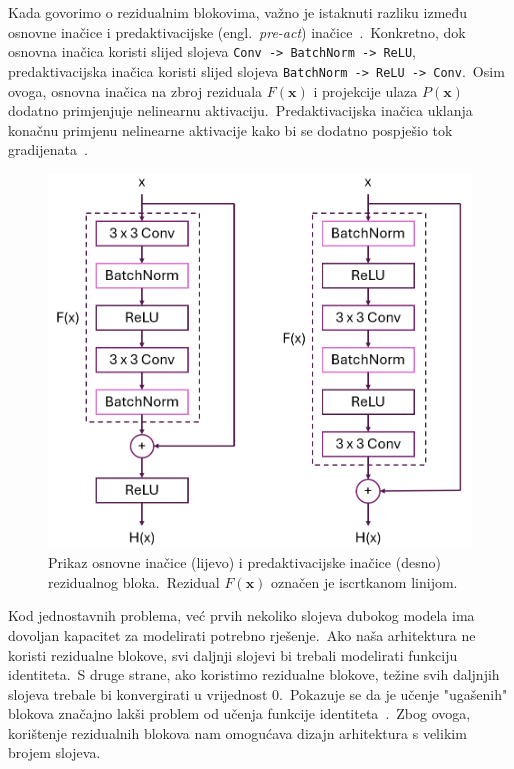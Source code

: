 \documentclass[diplomskirad]{fer}
\begin{document}
Kada govorimo o rezidualnim blokovima, važno je istaknuti razliku između osnovne inačice i predaktivacijske (engl.\ \textit{pre-act}) inačice~\cite{he2016identity}.\ 
Konkretno, dok osnovna inačica koristi slijed slojeva \texttt{Conv -> BatchNorm -> ReLU}, predaktivacijska inačica koristi slijed slojeva \texttt{BatchNorm -> ReLU -> Conv}.\ 
Osim ovoga, osnovna inačica na zbroj reziduala $F(\bm{x})$ i projekcije ulaza $P(\bm{x})$ dodatno primjenjuje nelinearnu aktivaciju.\ 
Predaktivacijska inačica uklanja konačnu primjenu nelinearne aktivacije kako bi se dodatno pospješio tok gradijenata~\cite{he2016identity}.\

\begin{figure}[h]
  \centering
  \includegraphics[scale=0.75]{./Slike/residual.png}
  \caption{Prikaz osnovne inačice (lijevo) i predaktivacijske inačice (desno) rezidualnog bloka.\ Rezidual $F(\bm{x})$ označen je iscrtkanom linijom.}
  \label{fig:residual}
\end{figure}

\pagebreak

Kod jednostavnih problema, već prvih nekoliko slojeva dubokog modela ima dovoljan kapacitet za modelirati potrebno rješenje.\ 
Ako naša arhitektura ne koristi rezidualne blokove, svi daljnji slojevi bi trebali modelirati funkciju identiteta.\ 
S druge strane, ako koristimo rezidualne blokove, težine svih daljnjih slojeva trebale bi konvergirati u vrijednost $0$.\ 
Pokazuje se da je učenje "ugašenih" blokova značajno lakši problem od učenja funkcije identiteta~\cite{he2016deep}.\ 
Zbog ovoga, korištenje rezidualnih blokova nam omogućava dizajn arhitektura s velikim brojem slojeva.\ 
\end{document}
